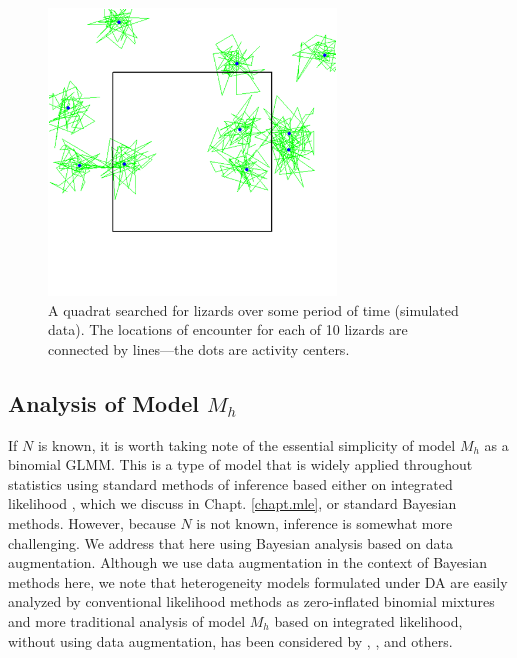 \begin{figure}[ht]
\begin{center}
\includegraphics[height=3in]{Ch4-Closed/figs/quadrat}
\end{center}
\caption{A quadrat searched for lizards over some period of time
  (simulated data). The locations of encounter for each of 10 lizards are
  connected by lines---the dots are activity centers.}
\label{closed.fig.quadrat}
\end{figure}







\subsection{Analysis of Model $M_h$}

If $N$ is known, it is worth taking note of the essential simplicity
of model $M_h$ as a binomial GLMM.  This is a type of model that is
widely applied throughout statistics using
standard methods of inference based either on integrated likelihood
\citep{laird_ware:1982, berger_etal:1999}, which we discuss in
Chapt. \ref{chapt.mle}, or standard Bayesian
methods. However, because $N$ is not known, inference is somewhat more
challenging. We address that here using Bayesian analysis based on
data augmentation. Although we use data augmentation in the context of
Bayesian methods here, we note that
heterogeneity models formulated under DA are easily analyzed by
conventional likelihood methods as zero-inflated binomial mixtures
\citep{royle:2006} and more traditional analysis of model $M_h$ based on
integrated likelihood, without using data augmentation, has been
considered by \citet{coull_agresti:1999}, \citet{dorazio_royle:2003},
and others.

